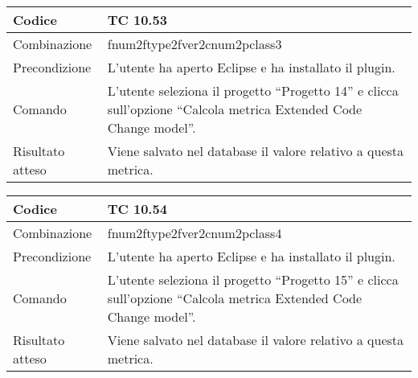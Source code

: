 \begin{table}[ht]
\begin{tabular}{|p{3cm}|p{9cm}|}
\hline
\cellcolor{lightgray}Codice				& TC 10.53								\\
\hline
\cellcolor{lightgray}Combinazione		& fnum2ftype2fver2cnum2pclass3									\\
\hline
\cellcolor{lightgray}Precondizione		& L'utente ha aperto Eclipse e ha installato il plugin.		\\
\hline
\cellcolor{lightgray}Comando			& L'utente seleziona il progetto ``Progetto 14''  e clicca sull'opzione ``Calcola metrica Extended Code Change model''.	\\
\hline
\cellcolor{lightgray}Risultato atteso	& Viene salvato nel database il valore relativo a questa metrica.\\
\hline
\end{tabular}
\end{table}

\begin{table}[ht]
\begin{tabular}{|p{3cm}|p{9cm}|}
\hline
\cellcolor{lightgray}Codice				& TC 10.54								\\
\hline
\cellcolor{lightgray}Combinazione		& fnum2ftype2fver2cnum2pclass4									\\
\hline
\cellcolor{lightgray}Precondizione		& L'utente ha aperto Eclipse e ha installato il plugin.		\\
\hline
\cellcolor{lightgray}Comando			& L'utente seleziona il progetto ``Progetto 15''  e clicca sull'opzione ``Calcola metrica Extended Code Change model''.	\\
\hline
\cellcolor{lightgray}Risultato atteso	& Viene salvato nel database il valore relativo a questa metrica.\\
\hline
\end{tabular}
\end{table}

\clearpage
